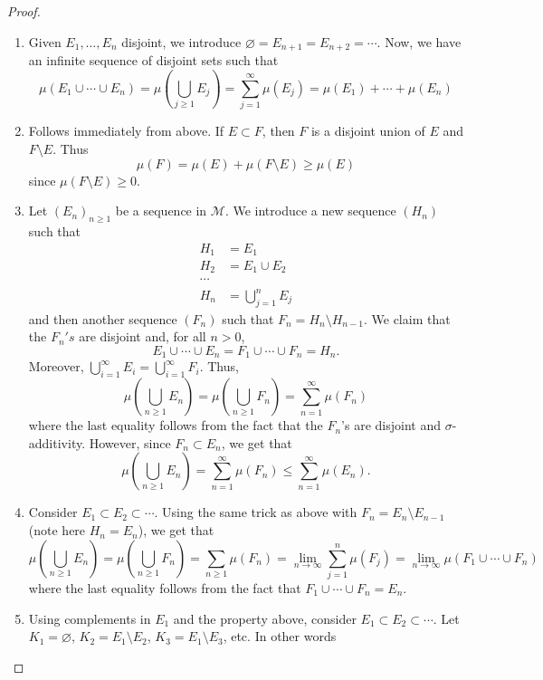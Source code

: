 \documentclass[11pt,leqno,oneside]{amsbook}
\numberwithin{thm}{section}
\newcommand{\M}{\mathcal{M}}
\newcommand{\s}{$\sigma$-} %
\renewcommand{\emptyset}{\varnothing}
\begin{document}
\begin{proof}
  \begin{enumerate}
  \item Given $E_1, \ldots, E_n$ disjoint, we introduce $\emptyset =
    E_{n+1} = E_{n+2} = \cdots$. Now, we have an infinite sequence of
    disjoint sets such that \[
      \mu(E_1 \cup \cdots \cup E_n) = \mu(\bigcup_{j \geq 1} E_j) =
      \sum_{j = 1}^\infty \mu(E_j) = \mu(E_1) + \cdots + \mu(E_n)
    \]
  \item Follows immediately from above. If $E \subset F$, then $F$ is
    a disjoint union of $E$ and $F \setminus E$. Thus \[
      \mu(F) = \mu(E) + \mu(F \setminus E) \geq \mu(E)
    \]
    since $\mu(F \setminus E) \geq 0$.
  \item Let $(E_n)_{n \geq 1}$ be a sequence in $\M$. We introduce a
    new sequence $(H_n)$ such that
    \begin{align*}
      H_1 & = E_1 \\
      H_2 & = E_1 \cup E_2 \\
      \cdots & \\
      H_n & = \bigcup_{j=1}^n E_j
    \end{align*}
    and then another sequence $(F_n)$ such that $F_n = H_n \setminus
    H_{n-1}$. We claim that the $F_n's$ are disjoint and, for all $n >
    0$, \[
      E_1 \cup \cdots \cup E_n = F_1 \cup \cdots \cup F_n = H_n.
    \]
    Moreover, $\bigcup_{i=1}^\infty E_i = \bigcup_{i=1}^\infty
    F_i$. Thus,
    \[
      \mu(\bigcup_{n \geq 1} E_n) = \mu(\bigcup_{n \geq 1} F_n) =
      \sum_{n=1}^\infty \mu(F_n)
    \]
    where the last equality follows from the fact that the $F_n$'s are
    disjoint and \s additivity. However, since $F_n \subset
    E_n$, we get that \[
      \mu(\bigcup_{n \geq 1} E_n) =
      \sum_{n=1}^\infty \mu(F_n) \leq \sum_{n=1}^\infty \mu(E_n).
    \]
  \item Consider $E_1 \subset E_2 \subset \cdots$. Using the same
    trick as above with $F_n = E_n \setminus E_{n-1}$ (note here $H_n
    = E_n$), we get that \[
      \mu\left(\bigcup_{n \geq 1} E_n\right) = \mu\left( \bigcup_{n
          \geq 1} F_n \right) = \sum_{n \geq 1} \mu(F_n) = \lim_{n \to
      \infty} \sum_{j=1}^n \mu(F_j) = \lim_{n \to \infty} \mu(F_1 \cup
    \cdots \cup F_n)
\]
where the last equality follows from the fact that $F_1 \cup \cdots
\cup F_n = E_n$.
  \item Using complements in $E_1$ and the property above, consider $E_1
    \subset E_2 \subset \cdots$. Let $K_1 = \emptyset$, $K_2 = E_1
    \setminus E_2$, $K_3 = E_1 \setminus E_3$, etc. In other words

\end{enumerate}
\end{proof}
\end{document}
